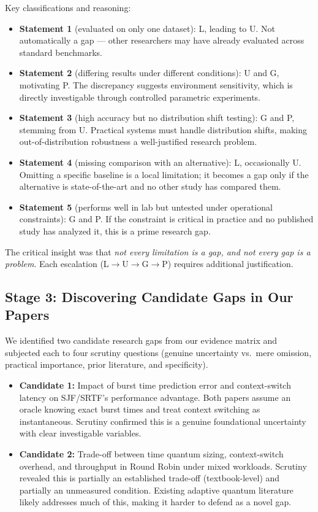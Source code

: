 \documentclass[11pt, a4paper]{article}
\begin{document}
Key classifications and reasoning:
\begin{itemize}[nosep]
    \item \textbf{Statement 1} (evaluated on only one dataset): L, leading to U. Not automatically a gap --- other researchers may have already evaluated across standard benchmarks.
    \item \textbf{Statement 2} (differing results under different conditions): U and G, motivating P. The discrepancy suggests environment sensitivity, which is directly investigable through controlled parametric experiments.
    \item \textbf{Statement 3} (high accuracy but no distribution shift testing): G and P, stemming from U. Practical systems must handle distribution shifts, making out-of-distribution robustness a well-justified research problem.
    \item \textbf{Statement 4} (missing comparison with an alternative): L, occasionally U. Omitting a specific baseline is a local limitation; it becomes a gap only if the alternative is state-of-the-art and no other study has compared them.
    \item \textbf{Statement 5} (performs well in lab but untested under operational constraints): G and P. If the constraint is critical in practice and no published study has analyzed it, this is a prime research gap.
\end{itemize}

The critical insight was that \emph{not every limitation is a gap, and not every gap is a problem}. Each escalation (L$\to$U$\to$G$\to$P) requires additional justification.

\subsection{Stage 3: Discovering Candidate Gaps in Our Papers}
We identified two candidate research gaps from our evidence matrix and subjected each to four scrutiny questions (genuine uncertainty vs.\ mere omission, practical importance, prior literature, and specificity).

\begin{itemize}[nosep]
    \item \textbf{Candidate 1:} Impact of burst time prediction error and context-switch latency on SJF/SRTF's performance advantage. Both papers assume an oracle knowing exact burst times and treat context switching as instantaneous. Scrutiny confirmed this is a genuine foundational uncertainty with clear investigable variables.
    \item \textbf{Candidate 2:} Trade-off between time quantum sizing, context-switch overhead, and throughput in Round Robin under mixed workloads. Scrutiny revealed this is partially an established trade-off (textbook-level) and partially an unmeasured condition. Existing adaptive quantum literature likely addresses much of this, making it harder to defend as a novel gap.
\end{itemize}
\end{document}

